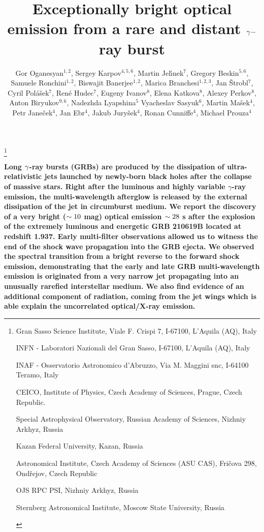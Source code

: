 \documentclass{naturesubmissionstyle}
\title{Exceptionally bright optical emission from a rare and distant $\rm \gamma-$ray burst}
\author{Gor Oganesyan$^{1,2}$, Sergey Karpov$^{4,5,6}$, Martin Jel\'{\i}nek$^{7}$, Gregory Beskin$^{5,6}$, Samuele Ronchini$^{1,2}$, Biswajit Banerjee$^{1,2}$,
Marica Branchesi$^{1,2,3}$,
Jan \v{S}trobl$^7$, Cyril Pol\'{a}\v{s}ek$^7$, Ren\'{e} Hudec$^7$,
Eugeny Ivanov$^{8}$, Elena Katkova$^{8}$, 
Alexey Perkov$^{8}$, Anton Biryukov$^{9,6}$, Nadezhda Lyapshina$^5$
Vyacheslav Sasyuk$^6$, Martin Ma\v{s}ek$^{4}$, Petr Jane\v{c}ek$^{4}$, Jan Ebr$^{4}$, 
Jakub Jury\v{s}ek$^{4}$, Ronan Cunniffe$^{4}$, Michael Prouza$^{4}$}
\date{}
\begin{document}
\maketitle
\let\thefootnote\relax\footnote{
\begin{affiliations}
\item Gran Sasso Science Institute, Viale F. Crispi 7, I-67100, L’Aquila (AQ), Italy 
\item INFN - Laboratori Nazionali del Gran Sasso, I-67100, L’Aquila (AQ), Italy
\item INAF - Osservatorio Astronomico d’Abruzzo, Via M. Maggini snc, I-64100 Teramo, Italy
\item CEICO, Institute of Physics, Czech Academy of Sciences, Prague, Czech Republic. 
\item Special Astrophysical Observatory, Russian Academy of Sciences, Nizhniy Arkhyz, Russia
\item Kazan Federal University, Kazan, Russia
\item Astronomical Institute, Czech Academy of Sciences (ASU CAS), Fri\v{c}ova 298, Ond\v{r}ejov, Czech Republic
\item OJS RPC PSI, Nizhniy Arkhyz, Russia
\item Sternberg Astronomical Institute, Moscow State University, Russia
\end{affiliations}
}

\baselineskip24pt



{\noindent \bf Long $\rm \gamma$-ray bursts (GRBs) are produced by the dissipation of ultra-relativistic jets launched by newly-born black holes after the collapse of massive stars. Right after the luminous and highly variable $\gamma$-ray emission, the multi-wavelength afterglow is released by the external dissipation of the jet in circumburst medium. We report the discovery of a very bright ($\rm \sim 10$ mag) optical emission 
$\rm \sim 28$ s after the
explosion of the extremely luminous and energetic GRB 210619B located at redshift 1.937.  
Early multi-filter observations allowed us to witness the end of the shock wave propagation into the GRB ejecta. We 
observed the spectral transition from a bright reverse to the forward shock emission, 
demonstrating that
the early and late GRB multi-wavelength emission is originated from a very narrow jet propagating into an unusually rarefied interstellar medium. We also find evidence of an additional component of radiation, coming from the jet wings which is able explain the uncorrelated optical/X-ray emission.  

}
\end{document}
